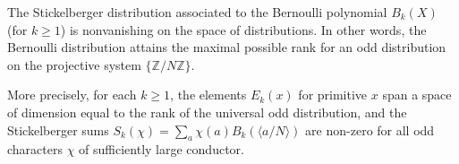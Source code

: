 The Stickelberger distribution associated to the Bernoulli polynomial $B_k(X)$
(for $k \geq 1$) is nonvanishing on the space of distributions. In other words,
the Bernoulli distribution attains the maximal possible rank for an
odd distribution on the projective system $\{\mathbb{Z}/N\mathbb{Z}\}$.

More precisely, for each $k \geq 1$, the elements $E_k(x)$ for primitive $x$ span
a space of dimension equal to the rank of the universal odd distribution, and the
Stickelberger sums $S_k(\chi) = \sum_{a} \chi(a) B_k(\langle a/N \rangle)$ are
non-zero for all odd characters $\chi$ of sufficiently large conductor.
